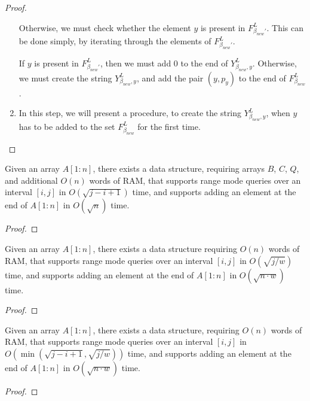\documentclass[runningheads]{llncs}
\begin{document}
\begin{proof}
\begin{enumerate}
        Otherwise, we must check whether the element $y$ is present in $F^L_{\beta_{new}'}$. 
        This can be done simply, by iterating through the elements of $F^L_{\beta_{new}'}$. 

        If $y$ is present in $F^L_{\beta_{new}'}$, then we must add $0$ to the end of $Y^L_{\beta_{new}, y}$.
        Otherwise, we must create the string $Y^L_{\beta_{new}, y}$, and add the pair $(y, p_y)$ to the end of $F^L_{\beta_{new}}$.
        
        \item In this step, we will present a procedure, to create the string $Y^L_{\beta_{new}, y}$, 
        when $y$ has to be added to the set $F^L_{\beta_{new}}$ for the first time.
    \end{enumerate}


\end{proof}


\begin{theorem}
    Given an array $A[1:n]$, there exists a data structure, requiring arrays $B$, $C$, $Q$, and additional $O(n)$ words of RAM, that supports 
    range mode queries over an interval $[i,j]$ in $O(\sqrt{j-i+1})$ time, and supports adding an element at the end of $A[1:n]$ in $O(\sqrt{n})$ time.
\end{theorem}
\begin{proof}

\end{proof}

\begin{lemma}
    Given an array $A[1:n]$, there exists a data structure requiring $O(n)$ words of RAM, that supports 
    range mode queries over an interval $[i,j]$ in $O( \sqrt{j/w}  )$ time, and supports adding an element at the end of $A[1:n]$ in $O(\sqrt{n \cdot w})$ time. 
\end{lemma}
\begin{proof}

\end{proof}


\begin{theorem}
    Given an array $A[1:n]$, there exists a data structure, requiring $O(n)$ words of RAM, that supports 
    range mode queries over an interval $[i,j]$ in $O(\min ( \sqrt{j-i+1}, \sqrt{j/w} ) )$ time, and supports adding an element at the end of $A[1:n]$ in $O(\sqrt{n \cdot w})$ time.     
\end{theorem}
\begin{proof}

\end{proof}
\end{document}

